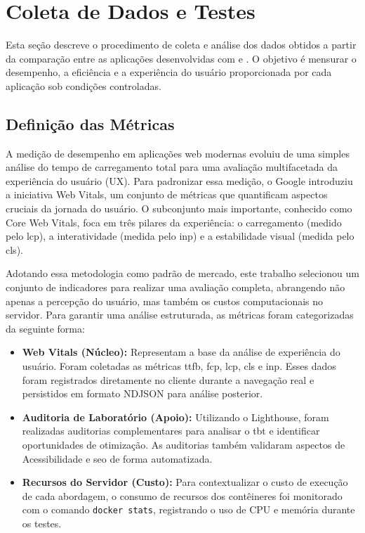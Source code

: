 \section{Coleta de Dados e Testes}
\label{sec:coleta-de-dados-e-testes}

Esta seção descreve o procedimento de coleta e análise dos dados obtidos a partir da comparação entre as aplicações desenvolvidas com  e . O objetivo é mensurar o desempenho, a eficiência e a experiência do usuário proporcionada por cada aplicação sob condições controladas.

\subsection{Definição das Métricas}

A medição de desempenho em aplicações web modernas evoluiu de uma simples análise do tempo de carregamento total para uma avaliação multifacetada da experiência do usuário (UX). Para padronizar essa medição, o Google introduziu a iniciativa Web Vitals, um conjunto de métricas que quantificam aspectos cruciais da jornada do usuário. O subconjunto mais importante, conhecido como Core Web Vitals, foca em três pilares da experiência: o carregamento (medido pelo \acrshort{lcp}), a interatividade (medida pelo \acrshort{inp}) e a estabilidade visual (medida pelo \acrshort{cls}).

Adotando essa metodologia como padrão de mercado, este trabalho selecionou um conjunto de indicadores para realizar uma avaliação completa, abrangendo não apenas a percepção do usuário, mas também os custos computacionais no servidor. Para garantir uma análise estruturada, as métricas foram categorizadas da seguinte forma:

\begin{itemize}
\item \textbf{Web Vitals (Núcleo):} Representam a base da análise de experiência do usuário. Foram coletadas as métricas \acrfull{ttfb}, \acrfull{fcp}, \acrfull{lcp}, \acrfull{cls} e \acrfull{inp}. Esses dados foram registrados diretamente no cliente durante a navegação real e persistidos em formato NDJSON para análise posterior.

\item \textbf{Auditoria de Laboratório (Apoio):} Utilizando o Lighthouse, foram realizadas auditorias complementares para analisar o \acrfull{tbt} e identificar oportunidades de otimização. As auditorias também validaram aspectos de Acessibilidade e \acrshort{seo} de forma automatizada.

\item \textbf{Recursos do Servidor (Custo):} Para contextualizar o custo de execução de cada abordagem, o consumo de recursos dos contêineres foi monitorado com o comando \texttt{docker stats}, registrando o uso de CPU e memória durante os testes.
\end{itemize}




